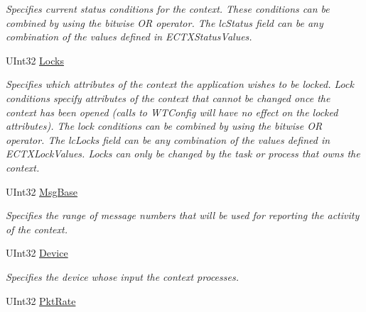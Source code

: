 \begin{DoxyCompactItemize}
\begin{DoxyCompactList}\small\item\em Specifies current status conditions for the context. These conditions can be combined by using the bitwise OR operator. The lcStatus field can be any combination of the values defined in ECTXStatusValues. \item\end{DoxyCompactList}\item 
UInt32 \hyperlink{class_wintab_d_n_1_1_c_wintab_context_a187da57874b1c4508be2ab344f7b0ea4}{Locks}
\begin{DoxyCompactList}\small\item\em Specifies which attributes of the context the application wishes to be locked. Lock conditions specify attributes of the context that cannot be changed once the context has been opened (calls to WTConfig will have no effect on the locked attributes). The lock conditions can be combined by using the bitwise OR operator. The lcLocks field can be any combination of the values defined in ECTXLockValues. Locks can only be changed by the task or process that owns the context. \item\end{DoxyCompactList}\item 
UInt32 \hyperlink{class_wintab_d_n_1_1_c_wintab_context_a9e0f2a0125c0f72f8d42f255eed799d9}{MsgBase}
\begin{DoxyCompactList}\small\item\em Specifies the range of message numbers that will be used for reporting the activity of the context. \item\end{DoxyCompactList}\item 
UInt32 \hyperlink{class_wintab_d_n_1_1_c_wintab_context_add1f6cc256a7a0aac3cd6ebdeaf8168d}{Device}
\begin{DoxyCompactList}\small\item\em Specifies the device whose input the context processes. \item\end{DoxyCompactList}\item 
UInt32 \hyperlink{class_wintab_d_n_1_1_c_wintab_context_a43dd191d974dedc6ca70e59ebe209ddb}{PktRate}

\end{DoxyCompactItemize}
